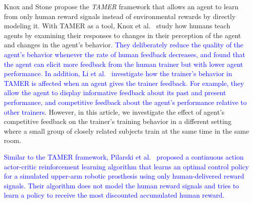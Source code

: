 Knox and Stone \cite{knox2009interactively} propose the \emph{TAMER} framework that allows an agent to learn from only human reward signals instead of environmental rewards 
by directly modeling it. %
With TAMER as a tool, Knox et al.\ \cite{knox2012humans} study how humans teach agents by examining their responses to changes in their perception of the agent and changes in 
the agent's behavior. \textcolor{blue}{They deliberately reduce the quality of the agent's behavior whenever the rate of human feedback decreases, and found that the agent can elicit more feedback from the human trainer but with lower agent performance.} %
\textcolor{blue}{In addition, Li et al.\ \cite{li2013using,li2014learning} investigate how the trainer's behavior in TAMER is affected when an agent gives the trainer feedback. For example, they allow the agent to display informative feedback about its past and present performance, and competitive feedback about the agent's performance relative to other trainers.} However, in this article, we investigate the effect of agent's competitive feedback on the trainer's training behavior in a different setting where a small group of closely related subjects train at the same time in the same room. %

\textcolor{blue}{Similar to the TAMER framework, %
Pilarski et al.\ \cite{pilarski2011online} proposed a continuous action actor-critic reinforcement learning algorithm \cite{grondman2012survey} that learns an optimal control policy for a simulated upper-arm robotic prosthesis using only human-delivered reward signals. Their algorithm does not model the human reward signals %
and tries to learn a policy to receive the most discounted accumulated human reward.%
}

